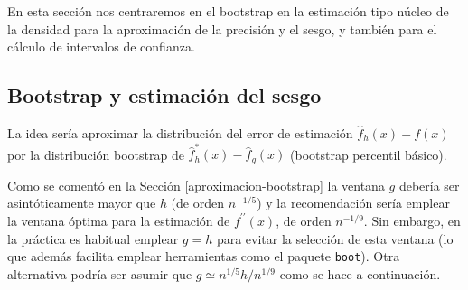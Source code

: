 \documentclass[
]{book}
\theoremstyle{break}
\theoremstyle{definition}
\theoremstyle{definition}
\theoremstyle{definition}
\theoremstyle{remark}
\begin{document}
En esta sección nos centraremos en el bootstrap en la estimación tipo núcleo de la densidad para la aproximación de la precisión y el sesgo, y también para el cálculo de intervalos de confianza.

\hypertarget{bootstrap-y-estimaciuxf3n-del-sesgo}{%
\subsection{Bootstrap y estimación del sesgo}\label{bootstrap-y-estimaciuxf3n-del-sesgo}}

La idea sería aproximar la distribución del error de estimación \(\hat f_h(x) - f(x)\) por la distribución bootstrap de \(\hat f^{\ast}_h(x) - \hat f_g(x)\) (bootstrap percentil básico).

Como se comentó en la Sección \ref{aproximacion-bootstrap} la ventana \(g\) debería ser asintóticamente mayor que \(h\) (de orden \(n^{-1/5}\)) y la recomendación sería emplear la ventana óptima para la estimación de \(f^{\prime \prime }\left( x \right)\), de orden \(n^{-1/9}\).
Sin embargo, en la práctica es habitual emplear \(g=h\) para evitar la selección de esta ventana (lo que además facilita emplear herramientas como el paquete \texttt{boot}).
Otra alternativa podría ser asumir que \(g \simeq n^{1/5}h/n^{1/9}\) como se hace a continuación.
\end{document}
